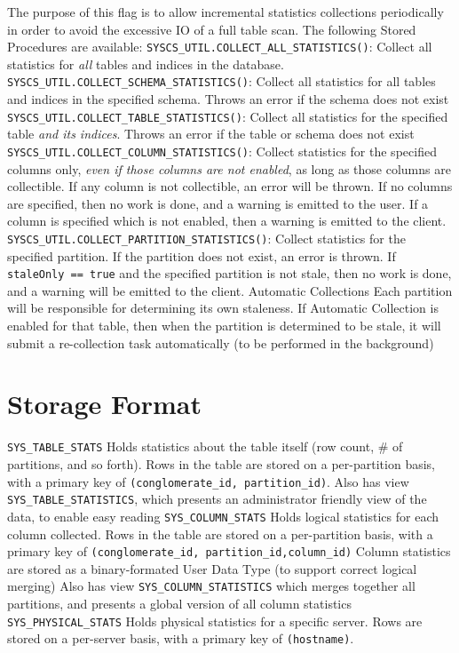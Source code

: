 \documentclass[10pt]{amsart}
\begin{document}
\begin{outline}[enumerate]
			\4[*] The purpose of this flag is to allow incremental statistics collections periodically in order to avoid the excessive IO of a full table scan.
		\3 The following Stored Procedures are available:
			\4 \texttt{SYSCS\_UTIL.COLLECT\_ALL\_STATISTICS()}: Collect all statistics for \emph{all} tables and indices in the database. 
			\4 \texttt{SYSCS\_UTIL.COLLECT\_SCHEMA\_STATISTICS()}: Collect all statistics for all tables and indices in the specified schema. Throws an error if the schema does not exist
			\4 \texttt{SYSCS\_UTIL.COLLECT\_TABLE\_STATISTICS()}: Collect all statistics for the specified table \emph{and its indices}. Throws an error if the table or schema does not exist
			\4 \texttt{SYSCS\_UTIL.COLLECT\_COLUMN\_STATISTICS()}: Collect statistics for the specified columns only, \emph{even if those columns are not enabled}, as long as those columns are collectible. If any column is not collectible, an error will be thrown. If no columns are specified, then no work is done, and a warning is emitted to the user. If a column is specified which is not enabled, then a warning is emitted to the client.
			\4 \texttt{SYSCS\_UTIL.COLLECT\_PARTITION\_STATISTICS()}: Collect statistics for the specified partition. If the partition does not exist, an error is thrown. If \texttt{staleOnly == true} and the specified partition is not stale, then no work is done, and a warning will be emitted to the client.
	\2 Automatic Collections
		\3[*] Each partition will be responsible for determining its own staleness. If Automatic Collection is enabled for that table, then when the partition is determined to be stale, it will submit a re-collection task automatically (to be performed in the background)

\end{outline}

\section{Storage Format}
\begin{outline}
\1 \texttt{SYS\_TABLE\_STATS}
	\2 Holds statistics about the table itself (row count, \# of partitions, and so forth). Rows in the table are stored on a per-partition basis, with a primary key of \texttt{(conglomerate\_id, partition\_id)}.
	\2 Also has view \texttt{SYS\_TABLE\_STATISTICS}, which presents an administrator friendly view of the data, to enable easy reading
\1 \texttt{SYS\_COLUMN\_STATS}
	\2 Holds logical statistics for each column collected. Rows in the table are stored on a per-partition basis, with a primary key of \texttt{(conglomerate\_id, partition\_id,column\_id)}
	\2 Column statistics are stored as a binary-formated User Data Type (to support correct logical merging)
	\2 Also has view \texttt{SYS\_COLUMN\_STATISTICS} which merges together all partitions, and presents a global version of all column statistics
\1 \texttt{SYS\_PHYSICAL\_STATS}
	\2 Holds physical statistics for a specific server. Rows are stored on a per-server basis, with a primary key of \texttt{(hostname)}.
\end{outline}
\end{document}
